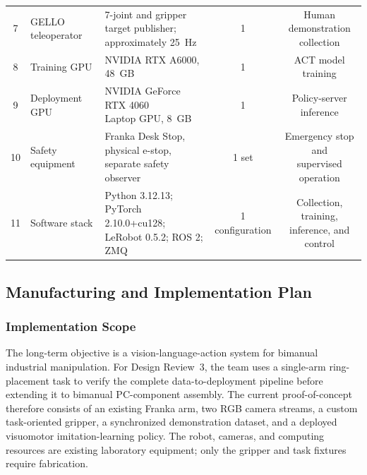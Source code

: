 \documentclass[12pt, letterpaper]{article}
\begin{document}
\begin{landscape}
\begin{longtable}{cllcc}
7 & GELLO teleoperator & \makecell[l]{7-joint and gripper target publisher;\\approximately 25~Hz} & 1 & \makecell[c]{Human demonstration\\collection}\\
8 & Training GPU & NVIDIA RTX A6000, 48~GB & 1 & \makecell[c]{ACT model\\training}\\
9 & Deployment GPU & \makecell[l]{NVIDIA GeForce RTX 4060\\Laptop GPU, 8~GB} & 1 & \makecell[c]{Policy-server\\inference}\\
10 & Safety equipment & \makecell[l]{Franka Desk Stop, physical e-stop,\\
separate safety observer} & 1 set & \makecell[c]{Emergency stop and\\supervised operation}\\
11 & Software stack & \makecell[l]{Python 3.12.13; PyTorch 2.10.0+cu128;\\
LeRobot 0.5.2; ROS 2; ZMQ} & 1 configuration & \makecell[c]{Collection, training,\\inference, and control}\\
\bottomrule
\end{longtable}

\endgroup
\end{landscape}
\normalsize


%

\subsection{Manufacturing and Implementation Plan}

\subsubsection{Implementation Scope}

The long-term objective is a vision-language-action system for bimanual
industrial manipulation. For Design Review~3, the team uses a single-arm
ring-placement task to verify the complete data-to-deployment pipeline before
extending it to bimanual PC-component assembly. The current proof-of-concept
therefore consists of an existing Franka arm, two RGB camera streams, a custom
task-oriented gripper, a synchronized demonstration dataset, and a deployed
visuomotor imitation-learning policy. The robot, cameras, and computing
resources are existing laboratory equipment; only the gripper and task
fixtures require fabrication.
\end{document}
